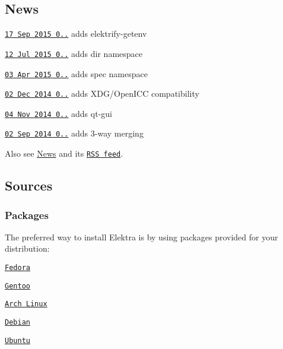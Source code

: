 \subsection*{News}


\begin{DoxyItemize}
\item \href{http://doc.libelektra.org/news/3c00a5f1-c017-4555-92b5-a2cf6e0803e3.html}{\tt 17 Sep 2015 0..} adds elektrify-\/getenv
\item \href{http://doc.libelektra.org/news/98770541-32a1-486a-98a1-d02f26afc81a.html}{\tt 12 Jul 2015 0..} adds dir namespace
\item \href{http://doc.libelektra.org/news/7d4647d4-4131-411e-9c2a-2aca39446e18.html}{\tt 03 Apr 2015 0..} adds spec namespace
\item \href{http://doc.libelektra.org/news/6ce57ecf-420a-4a31-821e-1c5fe5532eb4.html}{\tt 02 Dec 2014 0..} adds X\+D\+G/\+Open\+I\+C\+C compatibility
\item \href{http://doc.libelektra.org/news/38640673-3e07-4cff-9647-f6bdd89b1b08.html}{\tt 04 Nov 2014 0..} adds qt-\/gui
\item \href{http://doc.libelektra.org/news/eca69e19-5ddb-438c-ac06-57c20b1a9160.html}{\tt 02 Sep 2014 0..} adds 3-\/way merging
\end{DoxyItemize}

Also see \hyperlink{doc_NEWS_md}{News} and its \href{http://www.libelektra.org/news/feed.rss}{\tt R\+S\+S feed}.

\subsection*{Sources}

\subsubsection*{Packages}

The preferred way to install Elektra is by using packages provided for your distribution\+:
\begin{DoxyItemize}
\item \href{https://admin.fedoraproject.org/pkgdb/package/elektra/}{\tt Fedora}
\item \href{http://packages.gentoo.org/package/app-admin/elektra}{\tt Gentoo}
\item \href{https://aur.archlinux.org/packages/elektra/}{\tt Arch Linux}
\item \href{https://packages.debian.org/de/jessie/libelektra4}{\tt Debian}
\item \href{https://launchpad.net/ubuntu/+source/elektra}{\tt Ubuntu}
\end{DoxyItemize}

